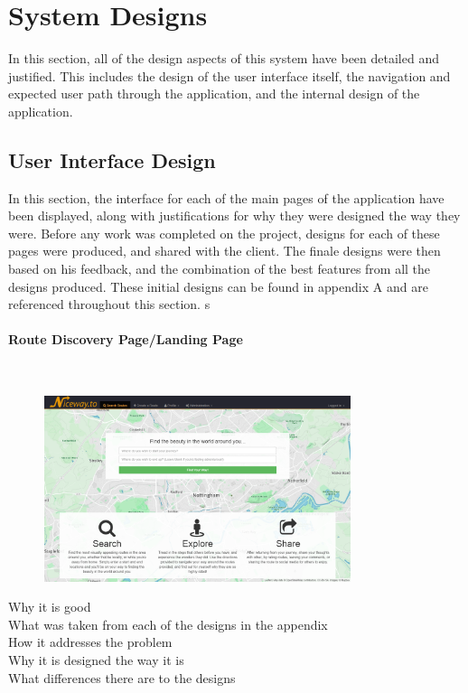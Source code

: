 \section{System Designs}
In this section, all of the design aspects of this system have been detailed and justified. This includes the design of the user interface itself, the navigation and expected user path through the application, and the internal design of the application.

\subsection{User Interface Design}
In this section, the interface for each of the main pages of the application have been displayed, along with justifications for why they were designed the way they were. Before any work was completed on the project, designs for each of these pages were produced, and shared with the client. The finale designs were then based on his feedback, and the combination of the best features from all the designs produced. These initial designs can be found in {\color{red} appendix A} and are referenced throughout this section.
s
\paragraph{Route Discovery Page/Landing Page}\ \\
\begin{figure}[!ht]
	\vspace{-5mm}
	\begin{center}
		\includegraphics[width=0.8\textwidth]{images/design/landing.png}
	\end{center}
	\vspace{-5mm}
\end{figure}

{\color{red}
\noindent 
Why it is good\ \\
What was taken from each of the designs in the appendix\ \\
How it addresses the problem \ \\
Why it is designed the way it is\ \\
What differences there are to the designs
}

